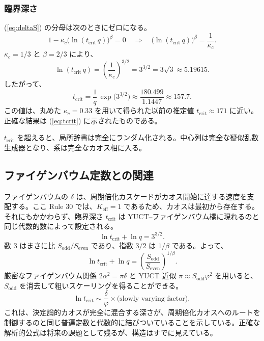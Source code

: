 \documentclass[11pt,a4paper]{article}
\begin{document}
	\subsubsection*{臨界深さ}
	(\ref{eq:deltaS}) の分母は次のときにゼロになる。
	\[
	1 - \kappa_c\bigl(\ln(t_{\mathrm{crit}}\,q)\bigr)^{\beta} = 0
	\quad\Longrightarrow\quad
	\bigl(\ln(t_{\mathrm{crit}}\,q)\bigr)^{\beta} = \frac{1}{\kappa_c}.
	\]
	\(\kappa_c = 1/3\) と \(\beta = 2/3\) により、
	\begin{equation}
		\ln(t_{\mathrm{crit}}\,q) = \left(\frac{1}{\kappa_c}\right)^{3/2}
		= 3^{3/2} = 3\sqrt{3} \approx 5.19615.
		\label{eq:crit-ln}
	\end{equation}
	したがって、
	\begin{equation}
		\boxed{t_{\mathrm{crit}} = \frac{1}{q}\,
			\exp\!\bigl(3^{3/2}\bigr)
			\approx \frac{180.499}{1.1447} \approx 157.7}.
		\label{eq:tcrit}
	\end{equation}
	この値は、丸めた \(\kappa_c = 0.33\) を用いて得られた以前の推定値 \(t_{\mathrm{crit}}\approx171\) に近い。正確な結果は (\ref{eq:tcrit}) に示されたものである。
	
	\(t_{\mathrm{crit}}\) を超えると、局所辞書は完全にランダム化される。中心列は完全な疑似乱数生成器となり、系は完全なカオス相に入る。
	
	\subsection{ファイゲンバウム定数との関連}
	\label{subsec:feigenbaum-link}
	
	ファイゲンバウムの \(\delta\) は、周期倍化カスケードがカオス開始に達する速度を支配する。ここ Rule 30 では、\(K_{\mathrm{eff}}=1\) であるため、カオスは最初から存在する。それにもかかわらず、臨界深さ \(t_{\mathrm{crit}}\) は YUCT–ファイゲンバウム橋に現れるのと同じ代数的数によって設定される。
	\[
	\ln t_{\mathrm{crit}} + \ln q = 3^{3/2}.
	\]
	数 \(3\) はまさに比 \(S_{\mathrm{odd}}/S_{\mathrm{even}}\) であり、指数 \(3/2\) は \(1/\beta\) である。よって、
	\[
	\ln t_{\mathrm{crit}} + \ln q =
	\left(\frac{S_{\mathrm{odd}}}{S_{\mathrm{even}}}\right)^{\!1/\beta}.
	\]
	厳密なファイゲンバウム関係 \(2\alpha^{2} = \pi\delta\) と YUCT 近似 \(\pi \approx S_{\mathrm{odd}}\varphi^{2}\) を用いると、\(S_{\mathrm{odd}}\) を消去して粗いスケーリングを得ることができる。
	\[
	\ln t_{\mathrm{crit}} \sim \frac{\delta}{\varphi} \times
	\bigl(\text{slowly varying factor}\bigr),
	\]
	これは、決定論的カオスが完全に混合する深さが、周期倍化カオスへのルートを制御するのと同じ普遍定数と代数的に結びついていることを示している。正確な解析的公式は将来の課題として残るが、構造はすでに見えている。
	
\end{document}
